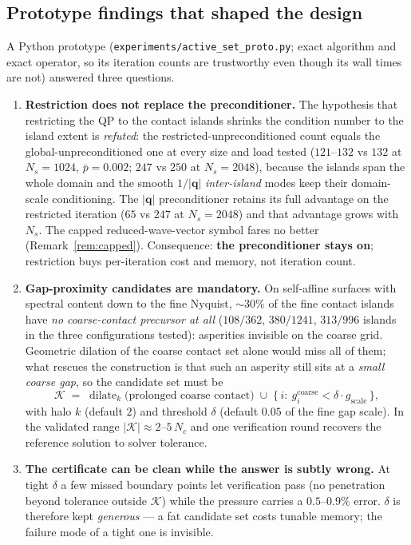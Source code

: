 \documentclass[11pt,a4paper]{article}
\newcommand{\abs}[1]{\left\lvert #1 \right\rvert}
\newcommand{\code}[1]{\texttt{#1}}
\theoremstyle{definition}
\theoremstyle{remark}
\begin{document}
\subsection{Prototype findings that shaped the design}
\label{sec:active-proto}

A Python prototype (\code{experiments/active\_set\_proto.py}; exact
algorithm and exact operator, so its iteration counts are trustworthy even
though its wall times are not) answered three questions.

\begin{enumerate}
\item \textbf{Restriction does not replace the preconditioner.} The
hypothesis that restricting the QP to the contact islands shrinks the
condition number to the island extent is \emph{refuted}: the
restricted-unpreconditioned count equals the global-unpreconditioned one at
every size and load tested ($121$--$132$ vs $132$ at $N_s=1024$,
$\bar p=0.002$; $247$ vs $250$ at $N_s=2048$), because the islands span the
whole domain and the smooth $1/\abs{\mathbf q}$ \emph{inter-island} modes
keep their domain-scale conditioning. The $\abs{\mathbf q}$ preconditioner
retains its full advantage on the restricted iteration ($65$ vs $247$ at
$N_s=2048$) and that advantage grows with $N_s$. The capped
reduced-wave-vector symbol fares no better (Remark~\ref{rem:capped}).
Consequence: \textbf{the preconditioner stays on}; restriction buys
per-iteration cost and memory, not iteration count.
\item \textbf{Gap-proximity candidates are mandatory.} On self-affine
surfaces with spectral content down to the fine Nyquist, ${\sim}30\%$ of the
fine contact islands have \emph{no coarse-contact precursor at all}
($108/362$, $380/1241$, $313/996$ islands in the three configurations
tested): asperities invisible on the coarse grid. Geometric dilation of the
coarse contact set alone would miss all of them; what rescues the
construction is that such an asperity still sits at a \emph{small coarse
gap}, so the candidate set must be
\begin{equation}
  \mathcal K \;=\; \operatorname{dilate}_k\!\bigl(\text{prolonged coarse
  contact}\bigr)\;\cup\;\{\,i:\ g^{\text{coarse}}_i<\delta\cdot
  g_{\text{scale}}\,\},
  \label{eq:candidate-set}
\end{equation}
with halo $k$ (default $2$) and threshold $\delta$ (default $0.05$ of the
fine gap scale). In the validated range $\abs{\mathcal K}\approx2$--$5\,N_c$
and one verification round recovers the reference solution to solver
tolerance.
\item \textbf{The certificate can be clean while the answer is subtly
wrong.} At tight $\delta$ a few missed boundary points let verification pass
(no penetration beyond tolerance outside $\mathcal K$) while the pressure
carries a $0.5$--$0.9\%$ error. $\delta$ is therefore kept \emph{generous}
--- a fat candidate set costs tunable memory; the failure mode of a tight
one is invisible.
\end{enumerate}
\end{document}
